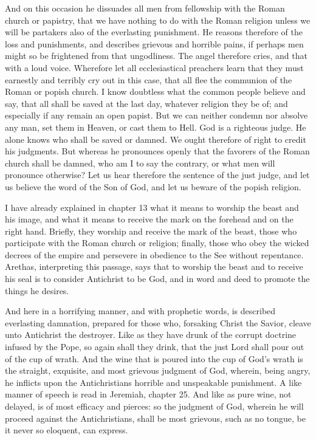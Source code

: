 And on this occasion he dissuades all men from fellowship with the Roman church or papistry, that we have nothing to do with the Roman religion unless we will be partakers also of the everlasting punishment. He reasons therefore of the loss and punishments, and describes grievous and horrible pains, if perhaps men might so be frightened from that ungodliness. The angel therefore cries, and that with a loud voice. Wherefore let all ecclesiastical preachers learn that they must earnestly and terribly cry out in this case, that all flee the communion of the Roman or popish church. I know doubtless what the common people believe and say, that all shall be saved at the last day, whatever religion they be of; and especially if any remain an open papist. But we can neither condemn nor absolve any man, set them in Heaven, or cast them to Hell. God is a righteous judge. He alone knows who shall be saved or damned. We ought therefore of right to credit his judgments. But whereas he pronounces openly that the favorers of the Roman church shall be damned, who am I to say the contrary, or what men will pronounce otherwise? Let us hear therefore the sentence of the just judge, and let us believe the word of the Son of God, and let us beware of the popish religion.

I have already explained in chapter 13 what it means to worship the beast and his image, and what it means to receive the mark on the forehead and on the right hand. Briefly, they worship and receive the mark of the beast, those who participate with the Roman church or religion; finally, those who obey the wicked decrees of the empire and persevere in obedience to the See without repentance. Arethas, interpreting this passage, says that to worship the beast and to receive his seal is to consider Antichrist to be God, and in word and deed to promote the things he desires.

And here in a horrifying manner, and with prophetic words, is described everlasting damnation, prepared for those who, forsaking Christ the Savior, cleave unto Antichrist the destroyer. Like as they have drunk of the corrupt doctrine infused by the Pope, so again shall they drink, that the just Lord shall pour out of the cup of wrath. And the wine that is poured into the cup of God’s wrath is the straight, exquisite, and most grievous judgment of God, wherein, being angry, he inflicts upon the Antichristians horrible and unspeakable punishment. A like manner of speech is read in Jeremiah, chapter 25. And like as pure wine, not delayed, is of most efficacy and pierces: so the judgment of God, wherein he will proceed against the Antichristians, shall be most grievous, such as no tongue, be it never so eloquent, can express.

